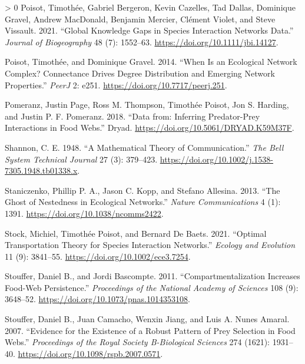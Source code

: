 \documentclass[10pt,oneside]{article}
\newlength{\cslhangindent}
\newenvironment{CSLReferences}[3] %
 {%
  \setlength{\parindent}{0pt}
  \ifodd #1 \everypar{\setlength{\hangindent}{\cslhangindent}}\ignorespaces\fi
  \ifnum #2 > 0
  \setlength{\parskip}{#2\baselineskip}
  \fi
 }%
 {}
\begin{document}
\begin{CSLReferences}{1}{0}
\leavevmode\hypertarget{ref-Poisot2021GloKno}{}%
Poisot, Timothée, Gabriel Bergeron, Kevin Cazelles, Tad Dallas,
Dominique Gravel, Andrew MacDonald, Benjamin Mercier, Clément Violet,
and Steve Vissault. 2021. {``Global Knowledge Gaps in Species
Interaction Networks Data.''} \emph{Journal of Biogeography} 48 (7):
1552--63. \url{https://doi.org/10.1111/jbi.14127}.

\leavevmode\hypertarget{ref-Poisot2014WheEcoa}{}%
Poisot, Timothée, and Dominique Gravel. 2014. {``When Is an Ecological
Network Complex? Connectance Drives Degree Distribution and Emerging
Network Properties.''} \emph{PeerJ} 2: e251.
\url{https://doi.org/10.7717/peerj.251}.

\leavevmode\hypertarget{ref-Pomeranz2018DatInf}{}%
Pomeranz, Justin Page, Ross M. Thompson, Timothée Poisot, Jon S.
Harding, and Justin P. F. Pomeranz. 2018. {``Data from: Inferring
Predator-Prey Interactions in Food Webs.''} Dryad.
\url{https://doi.org/10.5061/DRYAD.K59M37F}.

\leavevmode\hypertarget{ref-Shannon1948MatThe}{}%
Shannon, C. E. 1948. {``A Mathematical Theory of Communication.''}
\emph{The Bell System Technical Journal} 27 (3): 379--423.
\url{https://doi.org/10.1002/j.1538-7305.1948.tb01338.x}.

\leavevmode\hypertarget{ref-Staniczenko2013GhoNes}{}%
Staniczenko, Phillip P. A., Jason C. Kopp, and Stefano Allesina. 2013.
{``The Ghost of Nestedness in Ecological Networks.''} \emph{Nature
Communications} 4 (1): 1391. \url{https://doi.org/10.1038/ncomms2422}.

\leavevmode\hypertarget{ref-Stock2021OptTra}{}%
Stock, Michiel, Timothée Poisot, and Bernard De Baets. 2021. {``Optimal
Transportation Theory for Species Interaction Networks.''} \emph{Ecology
and Evolution} 11 (9): 3841--55.
\url{https://doi.org/10.1002/ece3.7254}.

\leavevmode\hypertarget{ref-Stouffer2011ComInc}{}%
Stouffer, Daniel B., and Jordi Bascompte. 2011. {``Compartmentalization
Increases Food-Web Persistence.''} \emph{Proceedings of the National
Academy of Sciences} 108 (9): 3648--52.
\url{https://doi.org/10.1073/pnas.1014353108}.

\leavevmode\hypertarget{ref-Stouffer2007EviExi}{}%
Stouffer, Daniel B., Juan Camacho, Wenxin Jiang, and Luis A. Nunes
Amaral. 2007. {``Evidence for the Existence of a Robust Pattern of Prey
Selection in Food Webs.''} \emph{Proceedings of the Royal Society
B-Biological Sciences} 274 (1621): 1931--40.
\url{https://doi.org/10.1098/rspb.2007.0571}.


\end{CSLReferences}
\end{document}
